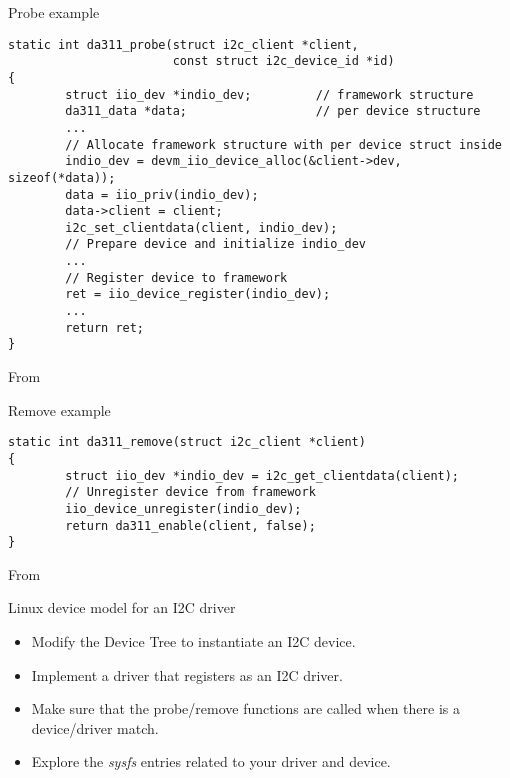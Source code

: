 \begin{frame}[fragile]{Probe example}
  \begin{block}{}
    \begin{verbatim}
static int da311_probe(struct i2c_client *client,
                       const struct i2c_device_id *id)
{
        struct iio_dev *indio_dev;         // framework structure
        da311_data *data;                  // per device structure
        ...
        // Allocate framework structure with per device struct inside
        indio_dev = devm_iio_device_alloc(&client->dev, sizeof(*data));
        data = iio_priv(indio_dev);
        data->client = client;
        i2c_set_clientdata(client, indio_dev);
        // Prepare device and initialize indio_dev
        ...
        // Register device to framework
        ret = iio_device_register(indio_dev);
        ...
        return ret;
}
    \end{verbatim}
  \end{block}
  From 
\end{frame}

\begin{frame}[fragile]{Remove example}
  \begin{block}{}
    \begin{verbatim}
static int da311_remove(struct i2c_client *client)
{
        struct iio_dev *indio_dev = i2c_get_clientdata(client);
        // Unregister device from framework
        iio_device_unregister(indio_dev);
        return da311_enable(client, false);
}
    \end{verbatim}
  \end{block}
  From 
\end{frame}

\setuplabframe
{Linux device model for an I2C driver}
{
  \begin{itemize}
  \item Modify the Device Tree to instantiate an I2C device.
  \item Implement a driver that registers as an I2C driver.
  \item Make sure that the probe/remove functions are called
        when there is a device/driver match.
  \item Explore the {\em sysfs} entries related to your driver and
    device.
  \end{itemize}
}

